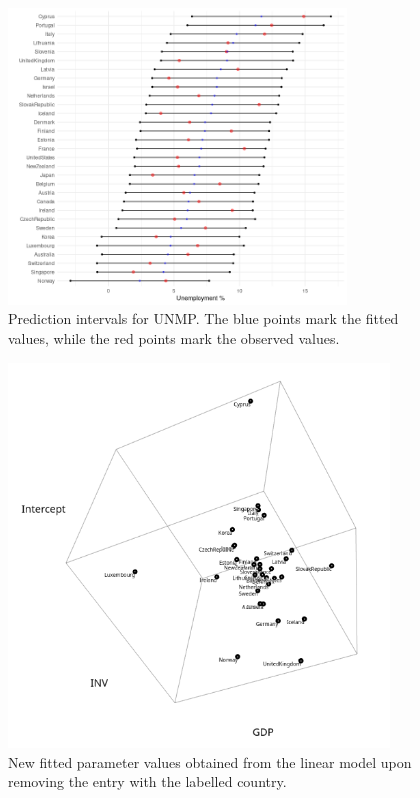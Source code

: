 \documentclass[10pt]{article}
\begin{document}
    \begin{figure}[H]
    \begin{center}
        \includegraphics[width=0.8\textwidth]{predicted_intervals_reduced.png}
    \end{center}
    \caption{Prediction intervals for UNMP. The blue points mark the fitted values,
    while the red points mark the observed values.}
    \label{fig:prediction_reduced}
    \end{figure}

    \begin{figure}[H]
    \begin{center}
        \includegraphics[width=0.9\textwidth]{loocv_reduced.png}
    \end{center}
    \caption{New fitted parameter values obtained from the linear model upon removing
    the entry with the labelled country.}
    \label{fig:loocv_reduced}
    \end{figure}
\end{document}
